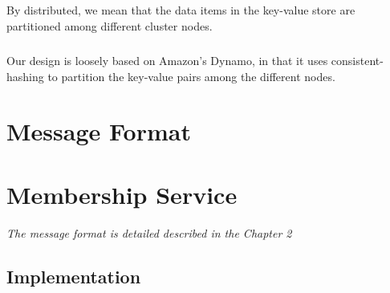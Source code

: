 \documentclass{report}
\begin{document}
			\paragraph{}By distributed, we mean that the data items in the key-value
			store are partitioned among different cluster nodes.
			
			\paragraph{} Our design is loosely based on Amazon's Dynamo, in that it
			uses consistent-hashing to partition the key-value pairs among the 
			different nodes.
	
	\chapter{Message Format}

			\paragraph{}
	        
	        \paragraph{}

	\chapter{Membership Service}
			\emph{The message format is detailed described in the Chapter 2}

	        \paragraph{}
	        
	        \paragraph{}

			\section{Implementation}
	
				\paragraph{}
				
				\paragraph{}
\end{document}
